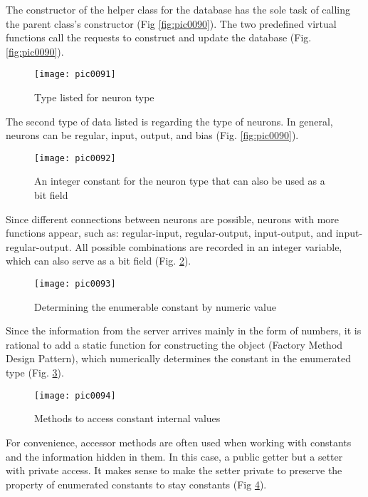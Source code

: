 The constructor of the helper class for the database has the sole task of calling the parent class's constructor (Fig \ref{fig:pic0090}). The two predefined virtual functions call the requests to construct and update the database (Fig. \ref{fig:pic0090}).

\begin{figure}[h]
\centering
\texttt{[image: pic0091]}
\caption{Type listed for neuron type}
\label{fig:pic0091}
\end{figure}
\FloatBarrier

The second type of data listed is regarding the type of neurons. In general, neurons can be regular, input, output, and bias (Fig. \ref{fig:pic0090}).

\begin{figure}[h]
\centering
\texttt{[image: pic0092]}
\caption{An integer constant for the neuron type that can also be used as a bit field}
\label{fig:pic0092}
\end{figure}
\FloatBarrier

Since different connections between neurons are possible, neurons with more functions appear, such as: regular-input, regular-output, input-output, and input-regular-output. All possible combinations are recorded in an integer variable, which can also serve as a bit field (Fig. \ref{fig:pic0092}).

\begin{figure}[h]
\centering
\texttt{[image: pic0093]}
\caption{Determining the enumerable constant by numeric value}
\label{fig:pic0093}
\end{figure}
\FloatBarrier

Since the information from the server arrives mainly in the form of numbers, it is rational to add a static function for constructing the object (Factory Method Design Pattern), which numerically determines the constant in the enumerated type (Fig. \ref{fig:pic0093}).

\begin{figure}[h]
\centering
\texttt{[image: pic0094]}
\caption{Methods to access constant internal values}
\label{fig:pic0094}
\end{figure}
\FloatBarrier

For convenience, accessor methods are often used when working with constants and the information hidden in them. In this case, a public getter but a setter with private access. It makes sense to make the setter private to preserve the property of enumerated constants to stay constants (Fig \ref{fig:pic0094}).
